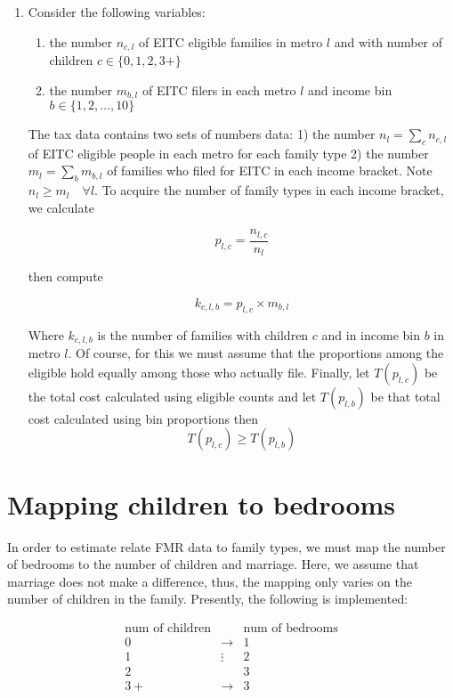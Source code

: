\documentclass[11pt,a4paper]{article}
\begin{document}
\begin{enumerate}[1.]
		\item Consider the following variables: 
		\begin{enumerate}
			\item the number $n_{c,l}$ of EITC eligible families in metro $l$ and with number of children $c\in \{0,1,2,3+\}$
			\item the number $m_{b,l}$ of EITC filers in each metro $l$ and income bin $b \in \{1,2,\dots, 10\}$
		\end{enumerate}
		The tax data contains two sets of numbers data: 1) the number $n_l = \sum_{c} n_{c,l}$ of EITC eligible people in each metro for each family type 2) the number $m_l = \sum_{b} m_{b,l}$ of families who filed for EITC in each income bracket. Note $n_l \geq m_l \quad \forall l$. To acquire the number of family types in each income bracket, we calculate
		
		$$p_{l,c} = \frac{n_{l,c}}{n_{l}}$$
		
		then compute 
		
		$$k_{c,l,b} = p_{l,c} \times m_{b,l}$$
		
		Where $k_{c,l,b}$ is the number of families with children $c$ and in income bin $b$ in metro $l$. Of course, for this we must assume that the proportions among the eligible hold equally among those who actually file. Finally, let $T(p_{l,c})$ be the total cost calculated using eligible counts and let $T(p_{l,b})$ be that total cost calculated using bin proportions then 
		$$T(p_{l,c}) \geq T(p_{l,b})$$
	\end{enumerate}
	
	\section{Mapping children to bedrooms}
	In order to estimate relate FMR data to family types, we must map the number of bedrooms to the number of children and marriage. Here, we assume that marriage does not make a difference, thus, the mapping only varies on the number of children in the family. Presently, the following is implemented:
	
	$$
	\begin{array}{ccc}
	\text{num of children} & & \text{num of bedrooms} \\
	0 &  \to & 1 \\
	1 & \vdots & 2 \\
	2 &  & 3 \\
	3+ & \to & 3 \\
	\end{array}
	$$
\end{document}
